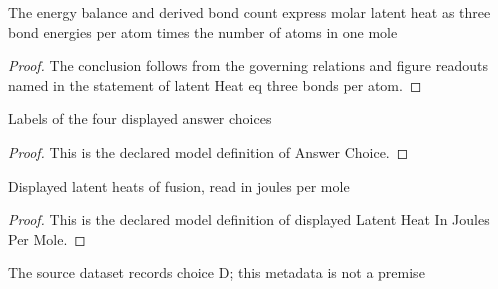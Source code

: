 \begin{lemma}
  \label{lem:physics:phyx-mini-0625:phyxminiproblems-problemphyxmini0625-latentheat-eq-three-bonds-per-atom}
  The energy balance and derived bond count express molar latent heat as three bond energies per atom times the number of atoms in one mole
\end{lemma}
\begin{proof}
  The conclusion follows from the governing relations and figure readouts named in the statement of latent Heat eq three bonds per atom.
\end{proof}
\begin{definition}
  \label{def:physics:phyx-mini-0625:phyxminiproblems-problemphyxmini0625-answerchoice}
  Labels of the four displayed answer choices
\end{definition}
\begin{proof}
  This is the declared model definition of Answer Choice.
\end{proof}
\begin{definition}
  \label{def:physics:phyx-mini-0625:phyxminiproblems-problemphyxmini0625-displayedlatentheatinjoulespermole}
  Displayed latent heats of fusion, read in joules per mole
\end{definition}
\begin{proof}
  This is the declared model definition of displayed Latent Heat In Joules Per Mole.
\end{proof}
\begin{definition}
  \label{def:physics:phyx-mini-0625:phyxminiproblems-problemphyxmini0625-recordedanswer}
  The source dataset records choice D; this metadata is not a premise
\end{definition}
